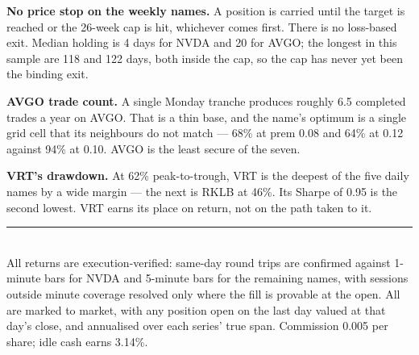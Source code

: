 \documentclass[11pt]{article}
\begin{document}
\textbf{No price stop on the weekly names.} A position is carried until the target is reached or
the 26-week cap is hit, whichever comes first. There is no loss-based exit. Median holding is 4
days for NVDA and 20 for AVGO; the longest in this sample are 118 and 122 days, both inside the
cap, so the cap has never yet been the binding exit.

\textbf{AVGO trade count.} A single Monday tranche produces roughly 6.5 completed trades a year on
AVGO. That is a thin base, and the name's optimum is a single grid cell that its neighbours do not
match --- 68\% at prem 0.08 and 64\% at 0.12 against 94\% at 0.10. AVGO is the least secure of the
seven.

\textbf{VRT's drawdown.} At 62\% peak-to-trough, VRT is the deepest of the five daily names by a
wide margin --- the next is RKLB at 46\%. Its Sharpe of 0.95 is the second lowest. VRT earns its
place on return, not on the path taken to it.

\vfill
{\color{bcrule}\rule{\textwidth}{0.6pt}}\\[0.2em]
{\footnotesize\color{bcgrey} All returns are execution-verified: same-day round trips are
confirmed against 1-minute bars for NVDA and 5-minute bars for the remaining names, with sessions
outside minute coverage resolved only where the fill is provable at the open. All are marked to
market, with any position open on the last day valued at that day's close, and annualised over
each series' true span. Commission 0.005 per share; idle cash earns 3.14\%.}
\end{document}
